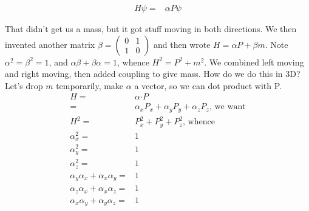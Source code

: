 \documentclass[]{article}
\begin{document}
\begin{align*}
H \psi =& \alpha P \psi
\end{align*}

That didn't get us a mass, but it got stuff moving in both directions. We then invented another matrix $\beta=\begin{pmatrix}
0&1\\
1&0
\end{pmatrix}$ and then wrote $H = \alpha P + \beta m$. Note $\alpha^2=\beta^2=1$, and $\alpha\beta + \beta\alpha=1$, whence $H^2=P^2+m^2$. We combined left moving and right moving, then added coupling to give mass. How do we do this in 3D?
 Let's  drop $m$ temporarily, make $\alpha$ a vector, so we can dot product with P.
\begin{align*}
H =& \alpha \boldsymbol{\cdot} P\\
=& \alpha_x P_x + \alpha_y P_y + \alpha_z P_z \text{, we want}\\
H^2 =& P_x^2 + P_y^2 + P_z^2 \text{, whence}\\
\alpha_x^2 =&1\\
\alpha_y^2 = &1\\
\alpha_z^2 =& 1 \\
\alpha_y\alpha_x + \alpha_x\alpha_y=&1\\
\alpha_z\alpha_x + \alpha_x\alpha_z=&1\\
\alpha_x\alpha_y + \alpha_y\alpha_z=&1
\end{align*}
\end{document}
